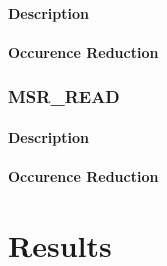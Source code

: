 \documentclass[MMR,Master,english]{twbook}
\begin{document}
\subsubsection{Description}
\subsubsection{Occurence Reduction}
\clearpage
\subsection{MSR\_READ}
\subsubsection{Description}
\subsubsection{Occurence Reduction}
\clearpage

\chapter{Results}\label{cha:results}

\end{document}
